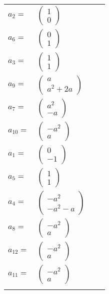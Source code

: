 \documentclass[1p]{elsarticle_modified}
\theoremstyle{definition}
\begin{document}
\begin{tabular}{m{7pt} m{180pt} m{7pt} m{180pt} }
\flushright $a_{2}=$&$\begin{pmatrix}1\\0\end{pmatrix}$ \\
\flushright $a_{6}=$&$\begin{pmatrix}0\\1\end{pmatrix}$ \\
\flushright $a_{3}=$&$\begin{pmatrix}1\\1\end{pmatrix}$ \\
\flushright $a_{9}=$&$\begin{pmatrix}a\\a^2+2 a\end{pmatrix}$ \\
\flushright $a_{7}=$&$\begin{pmatrix}a^2\\- a\end{pmatrix}$ \\
\flushright $a_{10}=$&$\begin{pmatrix}- a^2\\a\end{pmatrix}$ \\
\flushright $a_{1}=$&$\begin{pmatrix}0\\-1\end{pmatrix}$ \\
\flushright $a_{5}=$&$\begin{pmatrix}1\\1\end{pmatrix}$ \\
\flushright $a_{4}=$&$\begin{pmatrix}- a^2\\- a^2- a\end{pmatrix}$ \\
\flushright $a_{8}=$&$\begin{pmatrix}- a^2\\a\end{pmatrix}$ \\
\flushright $a_{12}=$&$\begin{pmatrix}- a^2\\a\end{pmatrix}$ \\
\flushright $a_{11}=$&$\begin{pmatrix}- a^2\\a\end{pmatrix}$\\&\end{tabular}
\end{document}
